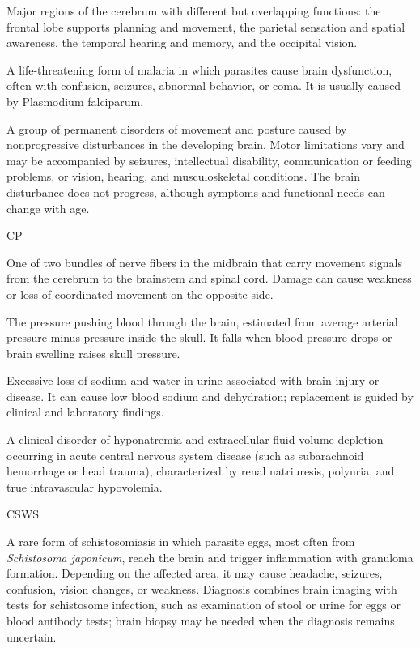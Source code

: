  Major regions of the cerebrum with different but overlapping functions: the frontal lobe supports planning and movement, the parietal sensation and spatial awareness, the temporal hearing and memory, and the occipital vision.

 A life-threatening form of malaria in which parasites cause brain dysfunction, often with confusion, seizures, abnormal behavior, or coma. It is usually caused by Plasmodium falciparum.

 A group of permanent disorders of movement and posture caused
by nonprogressive disturbances in the developing brain. Motor limitations vary and may
be accompanied by seizures, intellectual disability, communication or feeding problems,
or vision, hearing, and musculoskeletal conditions. The brain disturbance does not
progress, although symptoms and functional needs can change with age.

\synonyms
CP

 One of two bundles of nerve fibers in the midbrain that carry movement signals from the cerebrum to the brainstem and spinal cord. Damage can cause weakness or loss of coordinated movement on the opposite side.

 The pressure pushing blood through the brain, estimated from average arterial pressure minus pressure inside the skull. It falls when blood pressure drops or brain swelling raises skull pressure.

 Excessive loss of sodium and water in urine associated with brain injury or disease. It can cause low blood sodium and dehydration; replacement is guided by clinical and laboratory findings.

 A clinical disorder of hyponatremia and extracellular fluid volume depletion occurring in acute central nervous system disease (such as subarachnoid hemorrhage or head trauma), characterized by renal natriuresis, polyuria, and true intravascular hypovolemia.

\synonyms
CSWS

 A rare form of schistosomiasis in which parasite eggs, most often from \textit{Schistosoma japonicum}, reach the brain and trigger inflammation with granuloma formation. Depending on the affected area, it may cause headache, seizures, confusion, vision changes, or weakness. Diagnosis combines brain imaging with tests for schistosome infection, such as examination of stool or urine for eggs or blood antibody tests; brain biopsy may be needed when the diagnosis remains uncertain.

